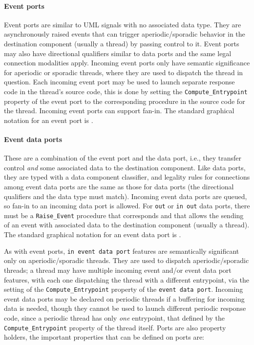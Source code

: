 \paragraph{Event ports} Event ports are similar to UML signals with no
associated data type. They are asynchronously raised events that can
trigger aperiodic/sporadic behavior in the destination component
(usually a thread) by passing control to it. Event ports may also have
directional qualifiers similar to data ports and the same legal
connection modalities apply. Incoming event ports only have semantic
significance for aperiodic or sporadic threads, where they are used to
dispatch the thread in question. Each incoming event port may be used
to launch separate response code in the thread's source code, this is
done by setting the \texttt{Compute\_Entrypoint} property of the event
port to the corresponding procedure in the source code for the
thread. Incoming event ports can support fan-in. The standard
graphical notation for an event port is \eventport.

\paragraph{Event data ports} These are a combination of the event port
and the data port, i.e., they transfer control \emph{and} some
associated data to the destination component. Like data ports, they
are typed with a data component classifier, and legality rules for
connections among event data ports are the same as those for data
ports (the directional qualifiers and the data type must
match). Incoming event data ports are queued, so fan-in to an incoming
data port is allowed. For \texttt{out} or \texttt{in out} data ports,
there must be a \texttt{Raise\_Event} procedure that corresponds and
that allows the sending of an event with associated data to the
destination component (usually a thread). The standard graphical
notation for an event data port is \eventdataport.

As with event ports, \texttt{in event data port} features are
semantically significant only on aperiodic/sporadic threads. They are
used to dispatch aperiodic/sporadic threads; a thread may have
multiple incoming event and/or event data port features, with each one
dispatching the thread with a different entrypoint, via the setting of
the \texttt{Compute\_Entrypoint} property of the \texttt{event data
  port}. Incoming event data ports may be declared on periodic threads
if a buffering for incoming data is needed, though they cannot be used
to launch different periodic response code, since a periodic thread
has only \emph{one} entrypoint, that defined by the
\texttt{Compute\_Entrypoint} property of the thread itself. Ports are
also property holders, the important properties that can be defined on
ports are:

